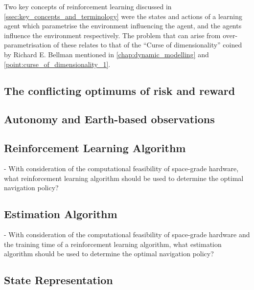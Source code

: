 Two key concepts of reinforcement learning discussed in \autoref{ssec:key_concepts_and_terminology} were the states and actions of a learning agent which parametrise the environment influencing the agent, and the agents influence the environment respectively. The problem that can arise from over-parametrisation of these relates to that of the ``Curse of dimensionality'' coined by Richard E. Bellman mentioned in \autoref{chap:dynamic_modelling} and \autoref{point:curse_of_dimensionality_1}.

\subsection{The conflicting optimums of risk and reward}\label{ssec:insight:conflicting-optimums}

\subsection{Autonomy and Earth-based observations}\label{ssec:insight:autonomy-earth-based}

\subsection{Reinforcement Learning Algorithm}

- With consideration of the computational feasibility of space-grade hardware, what reinforcement learning algorithm should be used to determine the optimal navigation policy?

\subsection{Estimation Algorithm}

- With consideration of the computational feasibility of space-grade hardware and the training time of a reinforcement learning algorithm, what estimation algorithm should be used to determine the optimal navigation policy?

\subsection{State Representation}

